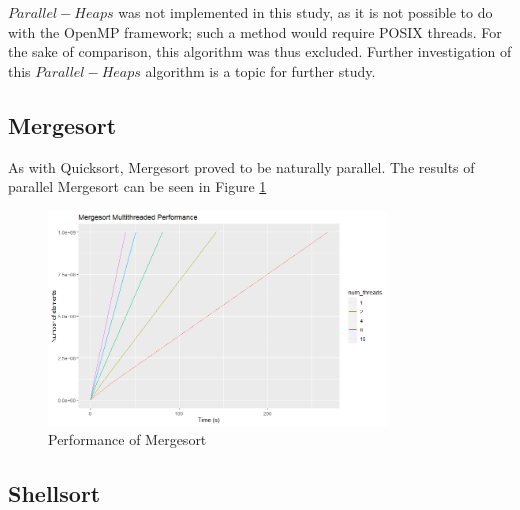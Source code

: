 \documentclass[conference]{IEEEtran}
\begin{document}
$Parallel-Heaps$ was not implemented in this study, as it is not possible to do with the OpenMP framework; such a method would require POSIX threads. 
For the sake of comparison, this algorithm was thus excluded. 
Further investigation of this $Parallel-Heaps$ algorithm is a topic for further study.  
\subsection{Mergesort}
As with Quicksort, Mergesort proved to be naturally parallel. 
The results of parallel Mergesort can be seen in Figure \ref{ms_per}
\begin{figure}[h]
	\includegraphics[width=9cm]{ms_per.png} 
	\caption{Performance of Mergesort}
	\label{ms_per}
\end{figure}



\subsection{Shellsort}
\end{document}
